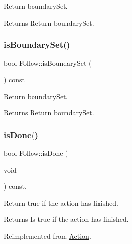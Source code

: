 Return boundary\+Set.

\begin{DoxyReturn}{Returns}
Return boundary\+Set. 
\end{DoxyReturn}
\mbox{\label{classFollow_a3f4d2d2ab13c544d7c40aa2a96fb2719}} 
\subsubsection{\texorpdfstring{is\+Boundary\+Set()}{isBoundarySet()}\hspace{0.1cm}{\footnotesize\ttfamily [2/2]}}
{\footnotesize\ttfamily bool Follow\+::is\+Boundary\+Set (\begin{DoxyParamCaption}{ }\end{DoxyParamCaption}) const\hspace{0.3cm}{\ttfamily [inline]}}

Return boundary\+Set.

\begin{DoxyReturn}{Returns}
Return boundary\+Set. 
\end{DoxyReturn}
\mbox{\label{classFollow_a7b551b92d3313e4fe3aadbed45283911}} 
\subsubsection{\texorpdfstring{is\+Done()}{isDone()}\hspace{0.1cm}{\footnotesize\ttfamily [1/2]}}
{\footnotesize\ttfamily bool Follow\+::is\+Done (\begin{DoxyParamCaption}\item[{void}]{ }\end{DoxyParamCaption}) const\hspace{0.3cm}{\ttfamily [override]}, {\ttfamily [virtual]}}

Return true if the action has finished.

\begin{DoxyReturn}{Returns}
Is true if the action has finished. 
\end{DoxyReturn}


Reimplemented from \hyperlink{classAction_a9b5dd627540a85f89f3e82acd46b7772}{Action}.

\mbox{\label{classFollow_a643d457b3bd235733eb9ae63ef5ebc1f}} 
